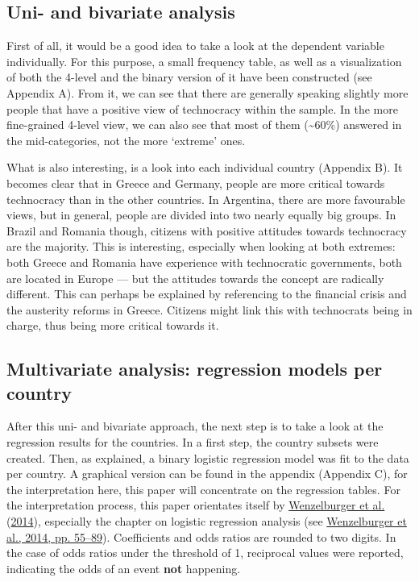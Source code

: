 \documentclass[
  12pt,
  english,
]{article}
\begin{document}
\hypertarget{uni--and-bivariate-analysis}{%
\subsection{Uni- and bivariate
analysis}\label{uni--and-bivariate-analysis}}

First of all, it would be a good idea to take a look at the dependent
variable individually. For this purpose, a small frequency table, as
well as a visualization of both the 4-level and the binary version of it
have been constructed (see Appendix A). From it, we can see that there
are generally speaking slightly more people that have a positive view of
technocracy within the sample. In the more fine-grained 4-level view, we
can also see that most of them (\textasciitilde60\%) answered in the
mid-categories, not the more `extreme' ones.

What is also interesting, is a look into each individual country
(Appendix B). It becomes clear that in Greece and Germany, people are
more critical towards technocracy than in the other countries. In
Argentina, there are more favourable views, but in general, people are
divided into two nearly equally big groups. In Brazil and Romania
though, citizens with positive attitudes towards technocracy are the
majority. This is interesting, especially when looking at both extremes:
both Greece and Romania have experience with technocratic governments,
both are located in Europe --- but the attitudes towards the concept are
radically different. This can perhaps be explained by referencing to the
financial crisis and the austerity reforms in Greece. Citizens might
link this with technocrats being in charge, thus being more critical
towards it.

\newpage{}

\hypertarget{multivariate-analysis-regression-models-per-country}{%
\subsection{Multivariate analysis: regression models per
country}\label{multivariate-analysis-regression-models-per-country}}

After this uni- and bivariate approach, the next step is to take a look
at the regression results for the countries. In a first step, the
country subsets were created. Then, as explained, a binary logistic
regression model was fit to the data per country. A graphical version
can be found in the appendix (Appendix C), for the interpretation here,
this paper will concentrate on the regression tables. For the
interpretation process, this paper orientates itself by
\protect\hyperlink{ref-wenzelburger2014statistische}{Wenzelburger et
al.} (\protect\hyperlink{ref-wenzelburger2014statistische}{2014}),
especially the chapter on logistic regression analysis (see
\protect\hyperlink{ref-wenzelburger2014statistische}{Wenzelburger et
al., 2014, pp. 55--89}). Coefficients and odds ratios are rounded to two
digits. In the case of odds ratios under the threshold of 1, reciprocal
values were reported, indicating the odds of an event \textbf{not}
happening.
\end{document}
